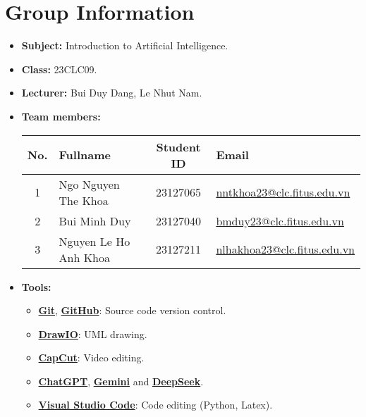 \section{Group Information}
\begin{itemize}
  \item \textbf{Subject:} Introduction to Artificial Intelligence.
  \item \textbf{Class:} 23CLC09.
  \item \textbf{Lecturer:} Bui Duy Dang, Le Nhut Nam.
  \item \textbf{Team members:}
        \begin{center}
          \renewcommand{\arraystretch}{1.5}
          \begin{tabular}{|c|l|c|l|}
            \hline
            \textbf{No.} & \textbf{Fullname}     & \textbf{Student ID} & \textbf{Email}                                                         \\\hline
            1            & Ngo Nguyen The Khoa   & 23127065            & \href{mailto:nntkhoa23@clc.fitus.edu.vn}{nntkhoa23@clc.fitus.edu.vn}   \\\hline
            2            & Bui Minh Duy          & 23127040            & \href{mailto:bmduy23@clc.fitus.edu.vn}{bmduy23@clc.fitus.edu.vn}       \\\hline
            3            & Nguyen Le Ho Anh Khoa & 23127211            & \href{mailto:nlhakhoa23@clc.fitus.edu.vn}{nlhakhoa23@clc.fitus.edu.vn} \\\hline
          \end{tabular}
        \end{center}
  \item \textbf{Tools:}
        \begin{itemize}
          \item \href{https://git-scm.com/}{\textbf{Git}}, \href{https://github.com/}{\textbf{GitHub}}: Source code version control.
          \item \href{https://app.diagrams.net/}{\textbf{DrawIO}}: UML drawing.
          \item \href{https://www.capcut.com/}{\textbf{CapCut}}: Video editing.
          \item \href{https://chatgpt.com/}{\textbf{ChatGPT}}, \href{https://gemini.google.com/}{\textbf{Gemini}} and \href{https://chat.deepseek.com/}{\textbf{DeepSeek}}.
          \item \href{https://code.visualstudio.com/}{\textbf{Visual Studio Code}}: Code editing (Python, Latex).
        \end{itemize}
\end{itemize}
